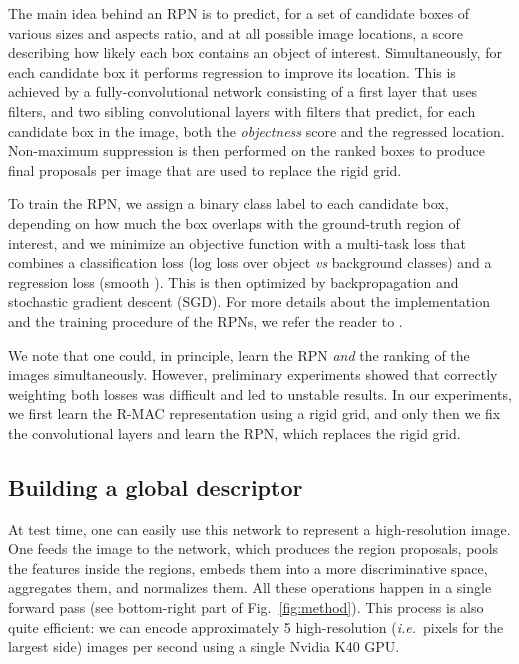 \documentclass[runningheads]{llncs}
\def\ie{\emph{i.e.}~}
\begin{document}
The main idea behind an RPN is to predict, for a set of candidate boxes of various sizes and aspects ratio, and at all possible image locations,
a score describing how likely each box contains an object of interest.
Simultaneously, for each candidate box it performs regression to improve its location.
This is achieved by a fully-convolutional network consisting of a first layer that uses  filters, and two sibling convolutional layers with  filters that predict, for each candidate box in the image, both the \emph{objectness} score and the regressed location. Non-maximum suppression is then performed on the ranked boxes to produce  final proposals per image that are used to replace the rigid grid.

To train the RPN, we assign a binary class label to each candidate box, depending on how much
the box overlaps with the ground-truth region of interest, and we minimize an objective function with a multi-task loss that combines a
classification loss (log loss over object \emph{vs} background classes)
and a regression loss (smooth  \cite{Girshick2015}). This is then optimized by backpropagation and
stochastic gradient descent (SGD). For more details about the implementation and the training procedure of the RPNs, we refer the reader to \cite{Ren2015faster}.

We note that one could, in principle, learn the RPN \emph{and} the ranking of the images simultaneously. However,
preliminary experiments showed that correctly weighting both losses was difficult and led to unstable results. 
In our experiments, we first learn the R-MAC representation using a rigid grid, and only then we fix the convolutional layers and learn the RPN, which replaces the rigid grid.

\subsection{Building a global descriptor}
\label{sec:globaldesc}
At test time, one can easily use this network to represent a high-resolution image. 
One feeds the image to the network, which produces the region proposals, pools the features inside the
regions, embeds them into a more discriminative space, aggregates them, and normalizes them. All these operations happen in a single forward pass
(see bottom-right part of Fig.~\ref{fig:method}). This process is also quite efficient: we can encode approximately 5 high-resolution (\ie  pixels for the largest side) images per second using a single Nvidia K40 GPU.
\end{document}
